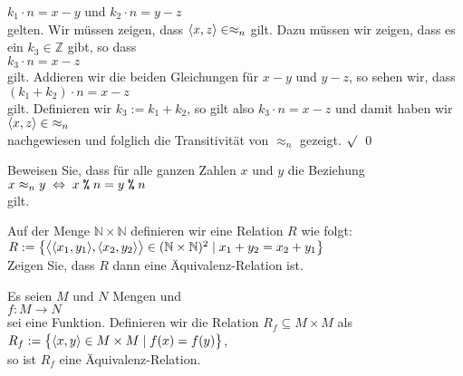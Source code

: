 \begin{enumerate}
      $k_1 \cdot n = x - y$ \quad und \quad $k_2 \cdot n = y - z$ 
      \\[0.2cm]
      gelten.  Wir m\"{u}ssen zeigen, dass $\pair(x,z) \in \approx_n$ gilt.  Dazu m\"{u}ssen wir zeigen,
      dass es ein $k_3 \in \mathbb{Z}$ gibt, so dass
      \\[0.2cm]
      \hspace*{1.3cm}
      $k_3 \cdot n = x - z$
      \\[0.2cm]
      gilt.  Addieren wir die beiden Gleichungen f\"{u}r $x-y$ und $y-z$, so sehen wir, dass
      \\[0.2cm]
      \hspace*{1.3cm}      
      $(k_1 + k_2) \cdot n = x - z$
      \\[0.2cm]
      gilt.  Definieren wir  $k_3 := k_1 + k_2$, so gilt also $k_3\cdot n = x - z$ und damit haben wir
      \\[0.2cm]
      \hspace*{1.3cm}
      $\pair(x,z) \in\; \approx_n$ 
      \\[0.2cm]
      nachgewiesen und folglich die Transitivit\"{a}t von $\approx_n$ gezeigt. $\surd$ 
      \qed
\end{enumerate}

\exercise
Beweisen Sie, dass f\"{u}r alle ganzen Zahlen $x$ und $y$ die Beziehung
\\[0.2cm]
\hspace*{1.3cm}
 $x \approx_n y \;\Leftrightarrow\; x \;\texttt{\%}\; n = y \;\texttt{\%}\; n$
\\[0.2cm]
gilt.
\exend


\exercise
Auf der Menge $\mathbb{N} \times \mathbb{N}$ definieren wir eine Relation $R$ wie folgt:
\\[0.2cm]
\hspace*{1.3cm}
$R := \bigl\{ \bigl\langle \pair(x_1, y_1) ,\pair(x_2, y_2) \bigr\rangle \in  (\mathbb{N} \times \mathbb{N})^2 \mid x_1 + y_2 = x_2 + y_1 \bigr\}$
\\[0.2cm]
Zeigen Sie, dass $R$ dann eine \"{A}quivalenz-Relation ist.
\exend


\begin{Satz} Es seien $M$ und $N$ Mengen und 
\\[0.2cm]
\hspace*{1.3cm}
$f : M \rightarrow N$
\\[0.2cm]
sei eine Funktion.  Definieren wir die Relation $R_f \subseteq M \times M$ als
\\[0.2cm]
\hspace*{1.3cm}
$R_f := \bigl\{ \pair(x,y) \in M \times M \mid f(x) = f(y) \bigr\}$,
\\[0.2cm]
so ist $R_f$ eine \"{A}quivalenz-Relation.  
\end{Satz}


